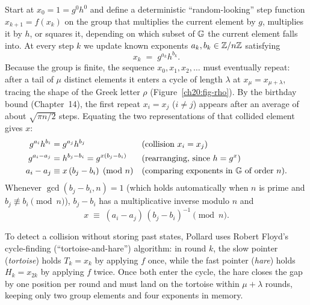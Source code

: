 Start at $x_0 = 1 = g^0 h^0$ and define a deterministic ``random-looking'' step function $x_{k+1} = f(x_k)$ on the group that multiplies the current element by $g$, multiplies it by $h$, or squares it, depending on which subset of $\mathbb{G}$ the current element falls into. At every step $k$ we update known exponents $a_k, b_k \in \mathbb{Z}/n\mathbb{Z}$ satisfying
\[
  x_k \;=\; g^{a_k} h^{b_k}.
\]
Because the group is finite, the sequence $x_0, x_1, x_2, \dots$ must eventually repeat: after a tail of $\mu$ distinct elements it enters a cycle of length $\lambda$ at $x_\mu = x_{\mu+\lambda}$, tracing the shape of the Greek letter $\rho$ (Figure~\ref{ch20:fig-rho}). By the birthday
bound (Chapter~14), the first repeat $x_i = x_j$ ($i \ne j$) appears after an average of about
$\sqrt{\pi n / 2}$ steps. Equating the two representations of that collided element gives $x$:
\begin{align*}
  g^{a_i} h^{b_i} &= g^{a_j} h^{b_j} && \text{(collision $x_i = x_j$)} \\
  g^{a_i - a_j} &= h^{b_j - b_i} = g^{x(b_j - b_i)} && \text{(rearranging, since $h = g^x$)} \\
  a_i - a_j &\equiv x\,(b_j - b_i) \pmod n && \text{(comparing exponents in $\mathbb{G}$ of order $n$).}
\end{align*}
Whenever $\gcd(b_j - b_i, n) = 1$ (which holds automatically when $n$ is prime and $b_j \not\equiv b_i \pmod n$), $b_j - b_i$ has a multiplicative inverse modulo $n$ and
\[
  x \;\equiv\; (a_i - a_j)\,(b_j - b_i)^{-1} \pmod n.
\]

To detect a collision without storing past states, Pollard uses Robert Floyd's cycle-finding (``tortoise-and-hare'') algorithm: in round $k$, the slow pointer (\emph{tortoise}) holds $T_k = x_k$ by applying $f$ once, while the fast pointer (\emph{hare}) holds $H_k = x_{2k}$ by applying $f$ twice. Once both enter the cycle, the hare closes the gap by one position per round and must land on the tortoise within $\mu + \lambda$ rounds, keeping only two group elements and four exponents in memory.

